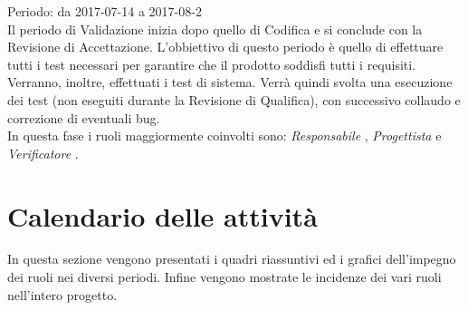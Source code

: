 Periodo: da 2017-07-14 a 2017-08-2 \\
Il periodo di Validazione inizia dopo quello di Codifica e si conclude con la Revisione
di Accettazione.
L'obbiettivo di questo periodo è quello di effettuare tutti i test necessari per garantire
che il prodotto soddisfi tutti i requisiti. Verranno, inoltre, effettuati i test di sistema. 
Verrà quindi svolta una esecuzione dei test (non eseguiti durante la Revisione di Qualifica), con successivo collaudo e correzione di eventuali bug.
\\
In questa fase i ruoli maggiormente coinvolti sono:  \emph{Responsabile} ,  \emph{Progettista} 
e  \emph{Verificatore} .

\section{Calendario delle attività}
In questa sezione vengono presentati i quadri riassuntivi ed i grafici dell’impegno dei ruoli nei diversi periodi. Infine vengono mostrate le incidenze dei vari ruoli nell’intero progetto.


